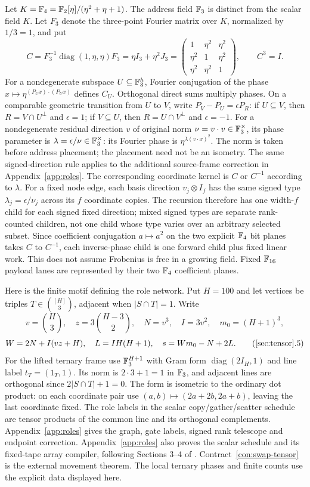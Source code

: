 Let $K=\mathbb F_4=\mathbb F_2[\eta]/(\eta^2+\eta+1)$. The address field $\mathbb F_3$ is distinct from the scalar field $K$. Let $F_3$ denote the three-point Fourier matrix over $K$, normalized by $1/3=1$, and put
\[
 C=F_3^{-1}\operatorname{diag}(1,\eta,\eta)F_3
 =\eta I_3+\eta^2J_3
 =\begin{pmatrix}1&\eta^2&\eta^2\\\eta^2&1&\eta^2\\\eta^2&\eta^2&1\end{pmatrix},\qquad C^3=I.
\]
For a nondegenerate subspace $U\subseteq\mathbb F_3^h$, Fourier conjugation of the phase $x\mapsto\eta^{(P_Ux)\cdot(P_Ux)}$ defines $C_U$. Orthogonal direct sums multiply phases. On a comparable geometric transition from $U$ to $V$, write $P_V-P_U=\epsilon P_R$: if $U\subseteq V$, then $R=V\cap U^\perp$ and $\epsilon=1$; if $V\subseteq U$, then $R=U\cap V^\perp$ and $\epsilon=-1$. For a nondegenerate residual direction $v$ of original norm $\nu=v\cdot v\in\mathbb F_3^\times$, its phase parameter is $\lambda=\epsilon/\nu\in\mathbb F_3^\times$: its Fourier phase is $\eta^{\lambda(v\cdot x)^2}$. The norm is taken before address placement; the placement need not be an isometry. The same signed-direction rule applies to the additional source-frame correction in Appendix~\ref{app:roles}. The corresponding coordinate kernel is $C$ or $C^{-1}$ according to $\lambda$. For a fixed node edge, each basis direction $v_j\otimes I_f$ has the same signed type $\lambda_j=\epsilon/\nu_j$ across its $f$ coordinate copies. The recursion therefore has one width-$f$ child for each signed fixed direction; mixed signed types are separate rank-counted children, not one child whose type varies over an arbitrary selected subset. Since coefficient conjugation $a\mapsto a^2$ on the two explicit $\mathbb F_4$ bit planes takes $C$ to $C^{-1}$, each inverse-phase child is one forward child plus fixed linear work. This does not assume Frobenius is free in a growing field. Fixed $\mathbb F_{16}$ payload lanes are represented by their two $\mathbb F_4$ coefficient planes.

Here is the finite motif defining the role network. Put $H=100$ and let vertices be triples $T\in\binom{[H]}3$, adjacent when $|S\cap T|=1$. Write
\[
 v=\binom{H}{3},\quad z=3\binom{H-3}{2},\quad N=v^3,\quad I=3v^2,
 \quad m_0=(H+1)^3,
\]
\[
 W=2N+I(vz+H),\quad L=I H(H+1),\quad s=Wm_0-N+2L.
 \tag{\ref{sec:tensor}.5}
\]
For the lifted ternary frame use $\mathbb F_3^{H+1}$ with Gram form $\operatorname{diag}(2I_H,1)$ and line label $t_T=(1_T,1)$. Its norm is $2\cdot3+1=1$ in $\mathbb F_3$, and adjacent lines are orthogonal since $2|S\cap T|+1=0$. The form is isometric to the ordinary dot product: on each coordinate pair use $(a,b)\mapsto(2a+2b,2a+b)$, leaving the last coordinate fixed. The role labels in the scalar copy/gather/scatter schedule are tensor products of the common line and its orthogonal complements. Appendix~\ref{app:roles} gives the graph, gate labels, signed rank telescope and endpoint correction. Appendix~\ref{app:roles} also proves the scalar schedule and its fixed-tape array compiler, following Sections 3--4 of \cite{OpenAI26}. Contract~\ref{con:swap-tensor} is the external movement theorem. The local ternary phases and finite counts use the explicit data displayed here.

